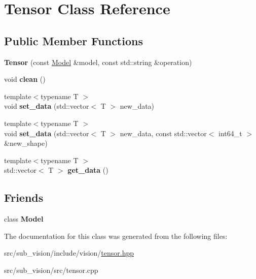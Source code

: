 \hypertarget{classTensor}{}\section{Tensor Class Reference}
\label{classTensor}
\subsection*{Public Member Functions}
\begin{DoxyCompactItemize}
\item 
\mbox{\label{classTensor_a6c3485c4cba54b46d089a5f7ff7343e4}} 
{\bfseries Tensor} (const \hyperlink{classModel}{Model} \&model, const std\+::string \&operation)
\item 
\mbox{\label{classTensor_a6ec8a2a453925c4c7c4b4f2e00e39969}} 
void {\bfseries clean} ()
\item 
\mbox{\label{classTensor_a88bad5d26a577b8c9fc17d9ed596b6de}} 
{\footnotesize template$<$typename T $>$ }\\void {\bfseries set\+\_\+data} (std\+::vector$<$ T $>$ new\+\_\+data)
\item 
\mbox{\label{classTensor_add3a04022143bd47e241cd43625701bb}} 
{\footnotesize template$<$typename T $>$ }\\void {\bfseries set\+\_\+data} (std\+::vector$<$ T $>$ new\+\_\+data, const std\+::vector$<$ int64\+\_\+t $>$ \&new\+\_\+shape)
\item 
\mbox{\label{classTensor_ab9c3963f3abe22265816ac0ba5663fd1}} 
{\footnotesize template$<$typename T $>$ }\\std\+::vector$<$ T $>$ {\bfseries get\+\_\+data} ()
\end{DoxyCompactItemize}
\subsection*{Friends}
\begin{DoxyCompactItemize}
\item 
\mbox{\label{classTensor_a2bf2a0e9b454c55aa5dcb5aa4698697b}} 
class {\bfseries Model}
\end{DoxyCompactItemize}


The documentation for this class was generated from the following files\+:\begin{DoxyCompactItemize}
\item 
src/sub\+\_\+vision/include/vision/\hyperlink{tensor_8hpp}{tensor.\+hpp}\item 
src/sub\+\_\+vision/src/tensor.\+cpp\end{DoxyCompactItemize}
